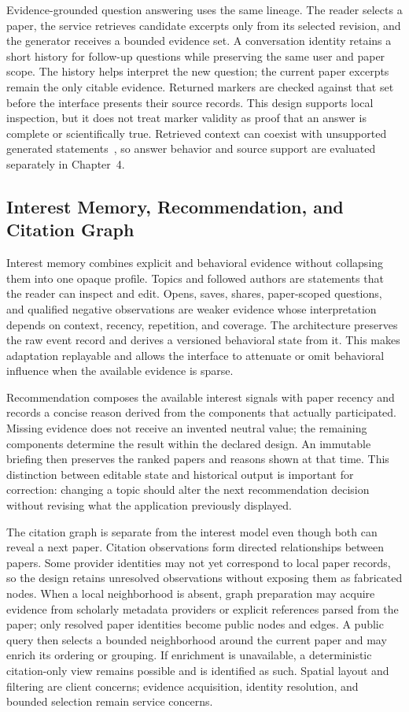 Evidence-grounded question answering uses the same lineage. The reader selects a paper, the service retrieves candidate excerpts only from its selected revision, and the generator receives a bounded evidence set. A conversation identity retains a short history for follow-up questions while preserving the same user and paper scope. The history helps interpret the new question; the current paper excerpts remain the only citable evidence. Returned markers are checked against that set before the interface presents their source records. This design supports local inspection, but it does not treat marker validity as proof that an answer is complete or scientifically true. Retrieved context can coexist with unsupported generated statements~\cite{niu2024ragtruth}, so answer behavior and source support are evaluated separately in Chapter~4.

\subsection{Interest Memory, Recommendation, and Citation Graph}

Interest memory combines explicit and behavioral evidence without collapsing them into one opaque profile. Topics and followed authors are statements that the reader can inspect and edit. Opens, saves, shares, paper-scoped questions, and qualified negative observations are weaker evidence whose interpretation depends on context, recency, repetition, and coverage. The architecture preserves the raw event record and derives a versioned behavioral state from it. This makes adaptation replayable and allows the interface to attenuate or omit behavioral influence when the available evidence is sparse.

Recommendation composes the available interest signals with paper recency and records a concise reason derived from the components that actually participated. Missing evidence does not receive an invented neutral value; the remaining components determine the result within the declared design. An immutable briefing then preserves the ranked papers and reasons shown at that time. This distinction between editable state and historical output is important for correction: changing a topic should alter the next recommendation decision without revising what the application previously displayed.

The citation graph is separate from the interest model even though both can reveal a next paper. Citation observations form directed relationships between papers. Some provider identities may not yet correspond to local paper records, so the design retains unresolved observations without exposing them as fabricated nodes. When a local neighborhood is absent, graph preparation may acquire evidence from scholarly metadata providers or explicit references parsed from the paper; only resolved paper identities become public nodes and edges. A public query then selects a bounded neighborhood around the current paper and may enrich its ordering or grouping. If enrichment is unavailable, a deterministic citation-only view remains possible and is identified as such. Spatial layout and filtering are client concerns; evidence acquisition, identity resolution, and bounded selection remain service concerns.

